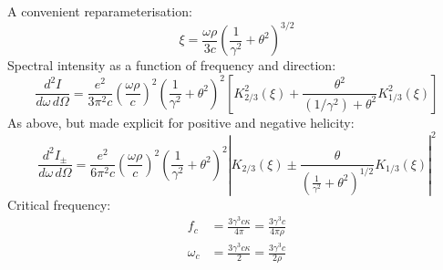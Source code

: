 \documentclass{article}
\begin{document}
A convenient reparameterisation:
\begin{equation}
    \xi = \frac{\omega\rho}{3c}\left(\frac{1}{\gamma^2} + \theta^2\right)^{3/2}
    \tag{J14.76}
\end{equation}
Spectral intensity as a function of frequency and direction:
\begin{equation}
    \frac{d^2I}{d\omega\,d\Omega} =
        \frac{e^2}{3\pi^2c}
        \left( \frac{\omega\rho}{c} \right)^2
        \left( \frac{1}{\gamma^2} + \theta^2 \right)^2
        \left[ K_{2/3}^2(\xi) + \frac{\theta^2}{(1/\gamma^2) + \theta^2} K_{1/3}^2(\xi) \right]
    \tag{J14.79}
\end{equation}
As above, but made explicit for positive and negative helicity:
\begin{equation}
    \frac{d^2I_\pm}{d\omega\,d\Omega} =
        \frac{e^2}{6\pi^2c}
        \left( \frac{\omega\rho}{c} \right)^2
        \left( \frac{1}{\gamma^2} + \theta^2 \right)^2
        \left| K_{2/3}(\xi) \pm \frac{\theta}{\left(\frac{1}{\gamma^2} + \theta^2\right)^{1/2}} K_{1/3}(\xi) \right|^2
    \tag{J Problem 14.25}
    \label{eqn:JP14_25}
\end{equation}
Critical frequency:
\begin{equation}
    \begin{aligned}
        f_c &= \frac{3\gamma^3 c\kappa}{4\pi}
             = \frac{3\gamma^3 c}{4\pi\rho} \\
        \omega_c &= \frac{3\gamma^3 c\kappa}{2}
                  = \frac{3\gamma^3 c}{2\rho}
    \end{aligned}
    \tag{J14.81}
\end{equation}
\end{document}
